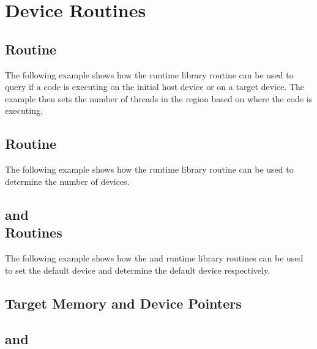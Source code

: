 \pagebreak
\chapter{Device Routines}
\label{chap:device}

\section{ Routine}

The following example shows how the  runtime library routine 
can be used to query if a code is executing on the initial host device or on a 
target device. The example then sets the number of threads in the  
region based on where the code is executing.



\section{ Routine}

The following example shows how the  runtime library routine 
can be used to determine the number of devices.



\section{ and \\
 Routines}

The following example shows how the  and  
runtime library routines can be used to set the default device and determine the 
default device respectively.



\section{Target Memory and Device Pointers}
\label{sec:target_memory_and_device_pointers}

\section{ and }

